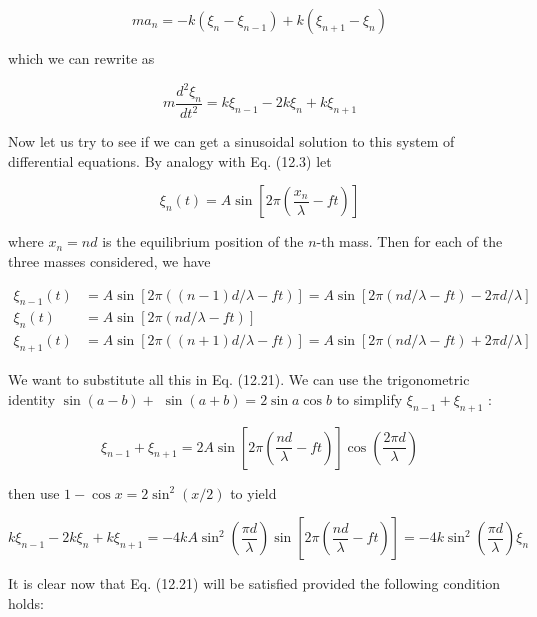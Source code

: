 \documentclass[10pt]{article}
\begin{document}
\begin{equation*}
m a_{n}=-k\left(\xi_{n}-\xi_{n-1}\right)+k\left(\xi_{n+1}-\xi_{n}\right) \tag{12.20}
\end{equation*}


which we can rewrite as


\begin{equation*}
m \frac{d^{2} \xi_{n}}{d t^{2}}=k \xi_{n-1}-2 k \xi_{n}+k \xi_{n+1} \tag{12.21}
\end{equation*}


Now let us try to see if we can get a sinusoidal solution to this system of differential equations. By analogy with Eq. (12.3) let

$$
\xi_{n}(t)=A \sin \left[2 \pi\left(\frac{x_{n}}{\lambda}-f t\right)\right]
$$

where $x_{n}=n d$ is the equilibrium position of the $n$-th mass. Then for each of the three masses considered, we have


\begin{align*}
\xi_{n-1}(t) & =A \sin [2 \pi((n-1) d / \lambda-f t)]=A \sin [2 \pi(n d / \lambda-f t)-2 \pi d / \lambda] \\
\xi_{n}(t) & =A \sin [2 \pi(n d / \lambda-f t)] \\
\xi_{n+1}(t) & =A \sin [2 \pi((n+1) d / \lambda-f t)]=A \sin [2 \pi(n d / \lambda-f t)+2 \pi d / \lambda] \tag{12.22}
\end{align*}


We want to substitute all this in Eq. (12.21). We can use the trigonometric identity $\sin (a-b)+$ $\sin (a+b)=2 \sin a \cos b$ to simplify $\xi_{n-1}+\xi_{n+1}$ :


\begin{equation*}
\xi_{n-1}+\xi_{n+1}=2 A \sin \left[2 \pi\left(\frac{n d}{\lambda}-f t\right)\right] \cos \left(\frac{2 \pi d}{\lambda}\right) \tag{12.23}
\end{equation*}


then use $1-\cos x=2 \sin ^{2}(x / 2)$ to yield


\begin{equation*}
k \xi_{n-1}-2 k \xi_{n}+k \xi_{n+1}=-4 k A \sin ^{2}\left(\frac{\pi d}{\lambda}\right) \sin \left[2 \pi\left(\frac{n d}{\lambda}-f t\right)\right]=-4 k \sin ^{2}\left(\frac{\pi d}{\lambda}\right) \xi_{n} \tag{12.24}
\end{equation*}


It is clear now that Eq. (12.21) will be satisfied provided the following condition holds:
\end{document}
